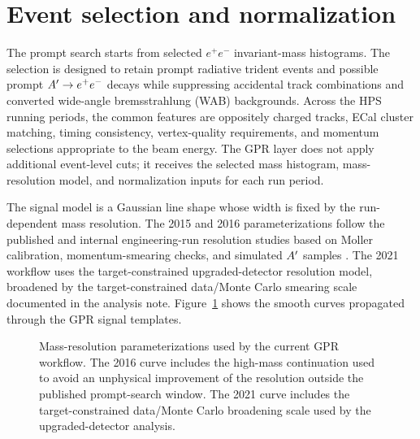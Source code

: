 \section{Event selection and normalization}
\label{sec:selection-normalization}

The prompt search starts from selected $e^+e^-$ invariant-mass histograms. The
selection is designed to retain prompt radiative trident events and possible prompt
$A^{\prime}\to e^+e^-$ decays while suppressing accidental track combinations and converted
wide-angle bremsstrahlung (WAB) backgrounds. Across the HPS running periods, the common
features are oppositely charged tracks, ECal cluster matching, timing consistency,
vertex-quality requirements, and momentum selections appropriate to the beam energy.
The GPR layer does not apply additional event-level cuts; it receives the selected
mass histogram, mass-resolution model, and normalization inputs for each run period.



The signal model is a Gaussian line shape whose width is fixed by the run-dependent
mass resolution. The 2015 and 2016 parameterizations follow the published and internal
engineering-run resolution studies based on Moller calibration, momentum-smearing
checks, and simulated $A^{\prime}$ samples \cite{HPS2015DarkPhoton,HPS2016PromptLong,
HPS2015InternalNote,HPS2016BumpInternal}. The 2021 workflow uses the target-constrained
upgraded-detector resolution model, broadened by the target-constrained data/Monte
Carlo smearing scale documented in the analysis note. Figure~\ref{fig:mass-resolution}
shows the smooth curves propagated through the GPR signal templates.

\begin{figure}[t]
\centering
{}
\caption{Mass-resolution parameterizations used by the current GPR workflow. The 2016
curve includes the high-mass continuation used to avoid an unphysical improvement of
the resolution outside the published prompt-search window. The 2021 curve includes the
target-constrained data/Monte Carlo broadening scale used by the upgraded-detector
analysis.}
\label{fig:mass-resolution}
\end{figure}

